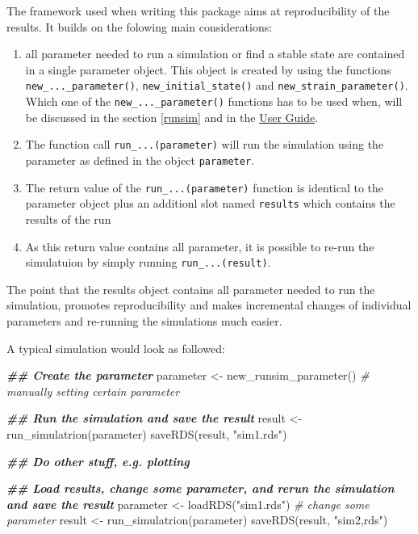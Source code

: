 \documentclass[
]{article}
\newenvironment{Shaded}{\begin{snugshade}}{\end{snugshade}}
\newcommand{\CommentTok}[1]{\textcolor[rgb]{0.56,0.35,0.01}{\textit{#1}}}
\newcommand{\DocumentationTok}[1]{\textcolor[rgb]{0.56,0.35,0.01}{\textbf{\textit{#1}}}}
\newcommand{\FunctionTok}[1]{\textcolor[rgb]{0.00,0.00,0.00}{#1}}
\newcommand{\NormalTok}[1]{#1}
\newcommand{\OtherTok}[1]{\textcolor[rgb]{0.56,0.35,0.01}{#1}}
\newcommand{\StringTok}[1]{\textcolor[rgb]{0.31,0.60,0.02}{#1}}
\providecommand{\tightlist}{%
  \setlength{\itemsep}{0pt}\setlength{\parskip}{0pt}}
\begin{document}
The framework used when writing this package aims at reproducibility of the results. It builds on the folowing main considerations:

\begin{enumerate}
\def\labelenumi{\arabic{enumi}.}
\tightlist
\item
  all parameter needed to run a simulation or find a stable state are contained in a single parameter object. This object is created by using the functions \texttt{new\_...\_parameter()}, \texttt{new\_initial\_state()} and \texttt{new\_strain\_parameter()}. Which one of the \texttt{new\_...\_parameter()} functions has to be used when, will be discussed in the section \ref{runsim} and in the \href{LINK_NEEDED}{User Guide}.
\item
  The function call \texttt{run\_...(parameter)} will run the simulation using the parameter as defined in the object \texttt{parameter}.
\item
  The return value of the \texttt{run\_...(parameter)} function is identical to the parameter object plus an additionl slot named \texttt{results} which contains the results of the run
\item
  As this return value contains all parameter, it is possible to re-run the simulatuion by simply running \texttt{run\_...(result)}.
\end{enumerate}

The point that the results object contains all parameter needed to run the simulation, promotes reproducibility and makes incremental changes of individual parameters and re-running the simulations much easier.

A typical simulation would look as followed:

\begin{Shaded}
\begin{Highlighting}[]
\DocumentationTok{\#\# Create the parameter}
\NormalTok{parameter }\OtherTok{\textless{}{-}} \FunctionTok{new\_runsim\_parameter}\NormalTok{()}
\CommentTok{\# manually setting certain parameter}

\DocumentationTok{\#\# Run the simulation and save the result}
\NormalTok{result }\OtherTok{\textless{}{-}} \FunctionTok{run\_simulatrion}\NormalTok{(parameter)}
\FunctionTok{saveRDS}\NormalTok{(result, }\StringTok{"sim1.rds"}\NormalTok{)}

\DocumentationTok{\#\# Do other stuff, e.g. plotting}

\DocumentationTok{\#\# Load results, change some parameter, and rerun the simulation and save the result}
\NormalTok{parameter }\OtherTok{\textless{}{-}} \FunctionTok{loadRDS}\NormalTok{(}\StringTok{"sim1.rds"}\NormalTok{)}
\CommentTok{\# change some parameter}
\NormalTok{result }\OtherTok{\textless{}{-}} \FunctionTok{run\_simulatrion}\NormalTok{(parameter)}
\FunctionTok{saveRDS}\NormalTok{(result, }\StringTok{"sim2,rds"}\NormalTok{)}
\end{Highlighting}
\end{Shaded}
\end{document}
